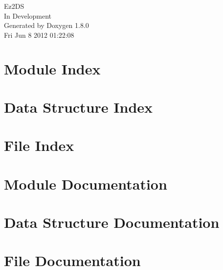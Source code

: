 \documentclass{book}
\begin{document}
\hypersetup{pageanchor=false,citecolor=blue}
\begin{titlepage}
\vspace*{7cm}
\begin{center}
{\Large Ez2\-D\-S \\[1ex]\large In Development }\\
\vspace*{1cm}
{\large Generated by Doxygen 1.8.0}\\
\vspace*{0.5cm}
{\small Fri Jun 8 2012 01:22:08}\\
\end{center}
\end{titlepage}
\clearemptydoublepage
{}
\tableofcontents
\clearemptydoublepage
{}
\hypersetup{pageanchor=true,citecolor=blue}
\chapter{Module Index}

\chapter{Data Structure Index}

\chapter{File Index}

\chapter{Module Documentation}








\chapter{Data Structure Documentation}














\chapter{File Documentation}









\printindex
\end{document}
